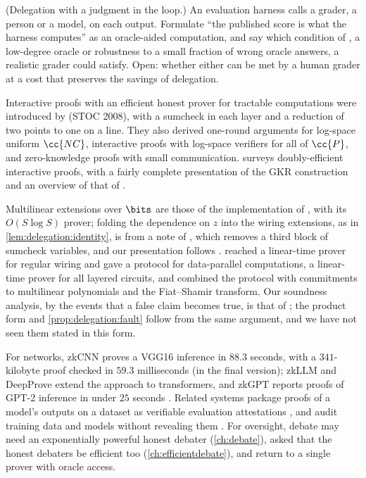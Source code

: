 \begin{refsection}
\begin{exercises}
\item \research (Delegation with a judgment in the loop.) An evaluation harness calls a grader, a person or a model, on each output. Formulate ``the published score is what the harness computes'' as an oracle-aided computation, and say which condition of \textcite{ChenKalaiXi2026}, a low-degree oracle or robustness to a small fraction of wrong oracle answers, a realistic grader could satisfy. Open: whether either can be met by a human grader at a cost that preserves the savings of delegation.\label{ex:delegation:oracle}
\end{exercises}

\notesandrefs
Interactive proofs with an efficient honest prover for tractable computations were introduced by \textcite{GoldwasserKalaiRothblum2015} (STOC 2008), with a sumcheck \parencite{LundEtAl1992} in each layer and a reduction of two points to one on a line. They also derived one-round arguments for log-space uniform $\cc{NC}$, interactive proofs with log-space verifiers for all of $\cc{P}$, and zero-knowledge proofs with small communication. \Textcite{Goldreich2018} surveys doubly-efficient interactive proofs, with a fairly complete presentation of the GKR construction and an overview of that of \textcite{ReingoldRothblumRothblum2021}.

Multilinear extensions over $\bits$ are those of the implementation of \textcite{CormodeMitzenmacherThaler2012}, with its $O(S\log S)$ prover; folding the dependence on $z$ into the wiring extensions, as in \cref{lem:delegation:identity}, is from a note of \textcite{Thaler2015}, which removes a third block of sumcheck variables, and our presentation follows \textcite[\S4.6]{Thaler2022}. \Textcite{Thaler2013} reached a linear-time prover for regular wiring and gave a protocol for data-parallel computations, \textcite{XieEtAl2019} a linear-time prover for all layered circuits, and \textcite{WahbyEtAl2018} combined the protocol with commitments to multilinear polynomials and the Fiat--Shamir transform. Our soundness analysis, by the events that a false claim becomes true, is that of \textcite{GoldwasserKalaiRothblum2015}; the product form and \cref{prop:delegation:fault} follow from the same argument, and we have not seen them stated in this form.

For networks, zkCNN \parencite{LiuXieZhang2021} proves a VGG16 inference in $88.3$ seconds, with a $341$-kilobyte proof checked in $59.3$ milliseconds (in the final version); zkLLM \parencite{SunLiZhang2024} and DeepProve \parencite{GaillyEtAl2026} extend the approach to transformers, and zkGPT reports proofs of GPT-2 inference in under $25$ seconds \parencite{QuEtAl2025}. Related systems package proofs of a model's outputs on a dataset as verifiable evaluation attestations \parencite{SouthEtAl2024}, and audit training data and models without revealing them \parencite{WaiwitlikhitEtAl2024}. For oversight, debate \parencite{IrvingEtAl2018} may need an exponentially powerful honest debater (\cref{ch:debate}), \textcite{BrownCohenEtAl2024} asked that the honest debaters be efficient too (\cref{ch:efficientdebate}), and \textcite{ChenKalaiXi2026} return to a single prover with oracle access.


\end{refsection}
